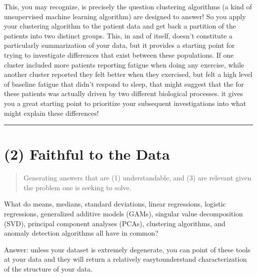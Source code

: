 \documentclass[letterpaper,10pt,english]{jupyterBook}
\begin{document}
\sphinxAtStartPar
This, you may recognize, is precisely the question clustering algorithms (a kind of unsupervised machine learning algorithm) are designed to answer! So you apply your clustering algorithm to the patient data and get back a partition of the patients into two distinct groups. This, in and of itself, doesn’t constitute a particularly  summarization of your data, but it provides a starting point for trying to investigate  differences that exist between these populations. If one cluster included more patients reporting fatigue when doing any exercise, while another cluster reported they felt better when they exercised, but felt a high level of baseline fatigue that didn’t respond to sleep, that might suggest that the  for these patients was actually driven by two different biological processes.  it gives you a great starting point to prioritize your subsequent investigations into what might explain these differences!


\bigskip\hrule\bigskip


\sphinxstepscope


\section{(2) Faithful to the Data}
\label{\detokenize{30_questions/18_exploratory_internal_faithful:faithful-to-the-data}}\label{\detokenize{30_questions/18_exploratory_internal_faithful::doc}}\begin{quote}

\sphinxAtStartPar
Generating answers that are (1) understandable,  and (3) are relevant given the problem one is seeking to solve.
\end{quote}

\sphinxAtStartPar
What do means, medians, standard deviations, linear regressions, logistic regressions, generalized additive models (GAMs), singular value decomposition (SVD), principal component analyses (PCAs), clustering algorithms, and anomaly detection algorithms all have in common?

\sphinxAtStartPar
Answer: unless your dataset is extremely degenerate, you can point  of these tools at your data and they will return a relatively easy\sphinxhyphen{}to\sphinxhyphen{}understand characterization of the structure of your data.
\end{document}
